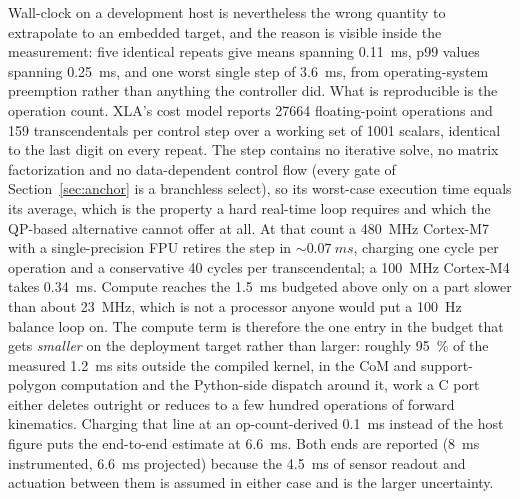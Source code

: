\documentclass[a4paper,fleqn]{cas-dc}
\begin{document}
Wall-clock on a development host is nevertheless the wrong quantity to extrapolate to an embedded target, and the reason is visible inside the measurement: five identical repeats give means spanning \SI{0.11}{ms}, p99 values spanning \SI{0.25}{ms}, and one worst single step of \SI{3.6}{ms}, from operating-system preemption rather than anything the controller did. What is reproducible is the operation count. XLA's cost model reports \num{27664} floating-point operations and \num{159} transcendentals per control step over a working set of \num{1001} scalars, identical to the last digit on every repeat. The step contains no iterative solve, no matrix factorization and no data-dependent control flow (every gate of Section~\ref{sec:anchor} is a branchless select), so its worst-case execution time equals its average, which is the property a hard real-time loop requires and which the QP-based alternative cannot offer at all. At that count a \SI{480}{MHz} Cortex-M7 with a single-precision FPU retires the step in ${\sim}\SI{0.07}{ms}$, charging one cycle per operation and a conservative \num{40} cycles per transcendental; a \SI{100}{MHz} Cortex-M4 takes \SI{0.34}{ms}. Compute reaches the \SI{1.5}{ms} budgeted above only on a part slower than about \SI{23}{MHz}, which is not a processor anyone would put a \SI{100}{Hz} balance loop on. The compute term is therefore the one entry in the budget that gets \emph{smaller} on the deployment target rather than larger: roughly \SI{95}{\percent} of the measured \SI{1.2}{ms} sits outside the compiled kernel, in the CoM and support-polygon computation and the Python-side dispatch around it, work a C port either deletes outright or reduces to a few hundred operations of forward kinematics. Charging that line at an op-count-derived \SI{0.1}{ms} instead of the host figure puts the end-to-end estimate at \SI{6.6}{ms}. Both ends are reported (\SI{8}{ms} instrumented, \SI{6.6}{ms} projected) because the \SI{4.5}{ms} of sensor readout and actuation between them is assumed in either case and is the larger uncertainty.
\end{document}
